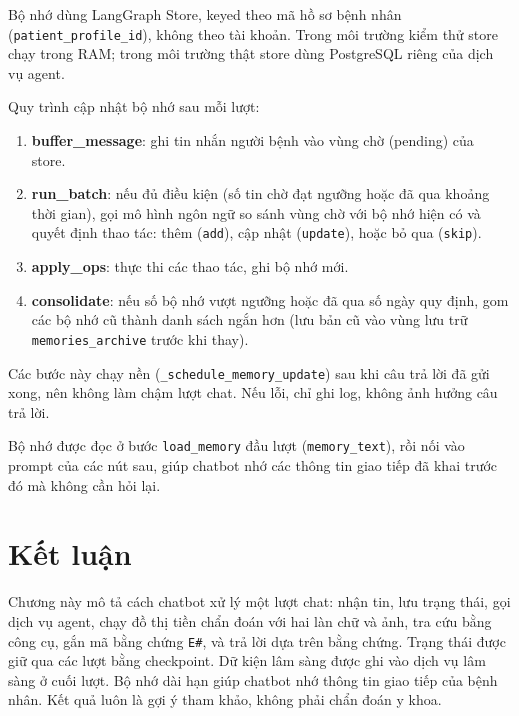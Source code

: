 Bộ nhớ dùng LangGraph Store, keyed theo mã hồ sơ bệnh nhân (\texttt{patient\_profile\_id}), không theo tài khoản. Trong môi trường kiểm thử store chạy trong RAM; trong môi trường thật store dùng PostgreSQL riêng của dịch vụ agent.

Quy trình cập nhật bộ nhớ sau mỗi lượt:

\begin{enumerate}
  \item \textbf{buffer\_message}: ghi tin nhắn người bệnh vào vùng chờ (pending) của store.
  \item \textbf{run\_batch}: nếu đủ điều kiện (số tin chờ đạt ngưỡng hoặc đã qua khoảng thời gian), gọi mô hình ngôn ngữ so sánh vùng chờ với bộ nhớ hiện có và quyết định thao tác: thêm (\texttt{add}), cập nhật (\texttt{update}), hoặc bỏ qua (\texttt{skip}).
  \item \textbf{apply\_ops}: thực thi các thao tác, ghi bộ nhớ mới.
  \item \textbf{consolidate}: nếu số bộ nhớ vượt ngưỡng hoặc đã qua số ngày quy định, gom các bộ nhớ cũ thành danh sách ngắn hơn (lưu bản cũ vào vùng lưu trữ \texttt{memories\_archive} trước khi thay).
\end{enumerate}

Các bước này chạy nền (\texttt{\_schedule\_memory\_update}) sau khi câu trả lời đã gửi xong, nên không làm chậm lượt chat. Nếu lỗi, chỉ ghi log, không ảnh hưởng câu trả lời.


Bộ nhớ được đọc ở bước \texttt{load\_memory} đầu lượt (\texttt{memory\_text}), rồi nối vào prompt của các nút sau, giúp chatbot nhớ các thông tin giao tiếp đã khai trước đó mà không cần hỏi lại.

\section{Kết luận}
\label{sec:ket-luan-chuong5}

Chương này mô tả cách chatbot xử lý một lượt chat: nhận tin, lưu trạng thái, gọi dịch vụ agent, chạy đồ thị tiền chẩn đoán với hai làn chữ và ảnh, tra cứu bằng công cụ, gắn mã bằng chứng \texttt{E\#}, và trả lời dựa trên bằng chứng. Trạng thái được giữ qua các lượt bằng checkpoint. Dữ kiện lâm sàng được ghi vào dịch vụ lâm sàng ở cuối lượt. Bộ nhớ dài hạn giúp chatbot nhớ thông tin giao tiếp của bệnh nhân. Kết quả luôn là gợi ý tham khảo, không phải chẩn đoán y khoa.

\endinput
\endinput
